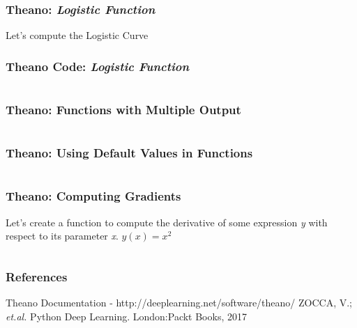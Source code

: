 \documentclass[aspectratio=169]{beamer}
\begin{document}
\begin{frame}
\frametitle{Theano: \textit{Logistic Function} }
Let's compute the Logistic Curve
\end{frame}

\begin{frame}
\frametitle{Theano Code: \emph{Logistic Function} }
\inputminted{python}{./aux_files/t7.py}
\end{frame}

\begin{frame}
\frametitle{Theano: Functions with Multiple Output}
\inputminted{python}{./aux_files/t8.py}
\end{frame}

\begin{frame}
\frametitle{Theano: Using Default Values in Functions}
\inputminted{python}{./aux_files/t9.py}
\end{frame}

\begin{frame}
\frametitle{Theano: Computing Gradients }
Let's create a function to compute the derivative of some expression  \textit{y} with respect to its parameter \textit{x}.
$y(x) = x^{2}$
\inputminted{python}{./aux_files/t10.py}
\end{frame}

\begin{frame}
\frametitle{References}
\footnotesize{
\begin{thebibliography}{99}
 Theano  Documentation - http://deeplearning.net/software/theano/
 ZOCCA, V.; \textit{et.al.} Python Deep Learning. London:Packt Books, 2017


\end{thebibliography}
}
\end{frame}
\end{document}

